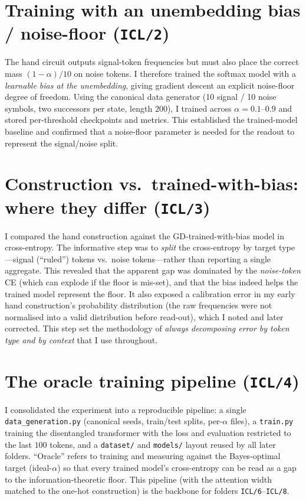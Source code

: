 \documentclass[12pt]{article}
\begin{document}
\section{Training with an unembedding bias / noise-floor (\texttt{ICL/2})}
The hand circuit outputs signal-token frequencies but must also place the correct mass
$(1-\alpha)/10$ on noise tokens. I therefore trained the softmax model with a \emph{learnable bias
at the unembedding}, giving gradient descent an explicit noise-floor degree of freedom. Using the
canonical data generator (10 signal / 10 noise symbols, two successors per state, length $200$), I
trained across $\alpha=0.1\text{--}0.9$ and stored per-threshold checkpoints and metrics. This
established the trained-model baseline and confirmed that a noise-floor parameter is needed for the
readout to represent the signal/noise split.

\section{Construction vs.\ trained-with-bias: where they differ (\texttt{ICL/3})}
I compared the hand construction against the GD-trained-with-bias model in cross-entropy. The
informative step was to \emph{split} the cross-entropy by target type---signal (``ruled'') tokens
vs.\ noise tokens---rather than reporting a single aggregate. This revealed that the apparent gap
was dominated by the \emph{noise-token} CE (which can explode if the floor is mis-set), and that
the bias indeed helps the trained model represent the floor. It also exposed a calibration error in
my early hand construction's probability distribution (the raw frequencies were not normalised into
a valid distribution before read-out), which I noted and later corrected. This step set the
methodology of \emph{always decomposing error by token type and by context} that I use throughout.

\section{The oracle training pipeline (\texttt{ICL/4})}
I consolidated the experiment into a reproducible pipeline: a single \texttt{data\_generation.py}
(canonical seeds, train/test splits, per-$\alpha$ files), a \texttt{train.py} training the
disentangled transformer with the loss and evaluation restricted to the last $100$ tokens, and a
\texttt{dataset/} and \texttt{models/} layout reused by all later folders. ``Oracle'' refers to
training and measuring against the Bayes-optimal target (ideal-$\alpha$) so that every trained
model's cross-entropy can be read as a gap to the information-theoretic floor. This pipeline (with
the attention width matched to the one-hot construction) is the backbone for folders
\texttt{ICL/6}--\texttt{ICL/8}.
\end{document}
